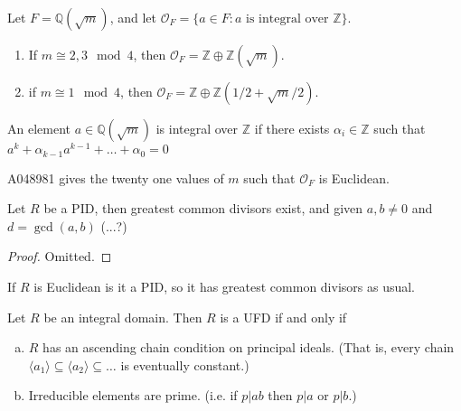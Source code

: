 \documentclass{article}
\newenvironment{example}[1][Example.]{
  \begin{trivlist} \item[\hskip \labelsep {\bfseries #1}]
}{\end{trivlist}}
\newenvironment{note}[1][Note.]{
  \begin{trivlist} \item[\hskip \labelsep {\bfseries #1}]
}{\end{trivlist}}
\newenvironment{theorem}[1][Theorem.]{
  \begin{trivlist} \item[\hskip \labelsep {\bfseries #1}]
}{\end{trivlist}}
\newcommand{\set}[1]{\{ #1 \}}
\newcommand{\ang}[1]{\langle #1 \rangle}
\begin{document}
\begin{example}
  Let $F = \mathbb Q(\sqrt m)$, and let
  $\mathcal O_F = \set{a \in F : a \text{ is integral over } \mathbb Z}$.
  \begin{enumerate}
    \item If $m \cong 2, 3 \mod 4$, then
    $\mathcal O_F = \mathbb Z \oplus \mathbb Z(\sqrt m)$.
    \item if $m \cong 1 \mod 4$, then
    $\mathcal O_F = \mathbb Z \oplus \mathbb Z(1/2 + \sqrt m / 2)$.
  \end{enumerate}
\end{example}
\begin{note}
  An element $a \in \mathbb Q(\sqrt m)$ is integral over $\mathbb Z$ if there
  exists $\alpha_i \in \mathbb Z$ such that
  $a^k + \alpha_{k-1}a^{k-1} + \hdots + \alpha_0 = 0$
\end{note}
\begin{note}
  A048981 gives the twenty one values of $m$ such that $\mathcal O_F$ is Euclidean.
\end{note}
\begin{theorem}[Lemma.]
  Let $R$ be a PID, then greatest common divisors exist, and given $a, b \neq 0$ and
  $d = \gcd(a, b)$ (...?)
\end{theorem}
\begin{proof} Omitted.
\end{proof}
\begin{theorem}[Corollary]
  If $R$ is Euclidean is it a PID, so it has greatest common divisors as usual.
\end{theorem}
\begin{theorem}
  Let $R$ be an integral domain. Then $R$ is a UFD if and only if
  \begin{enumerate}[(a)]
    \item $R$ has an ascending chain condition on principal ideals.
    (That is, every chain $\ang{a_1} \subseteq \ang{a_2} \subseteq \hdots$
    is eventually constant.)
    \item Irreducible elements are prime. (i.e. if $p|ab$ then $p|a$ or $p|b$.)
  \end{enumerate}
\end{theorem}
\end{document}
